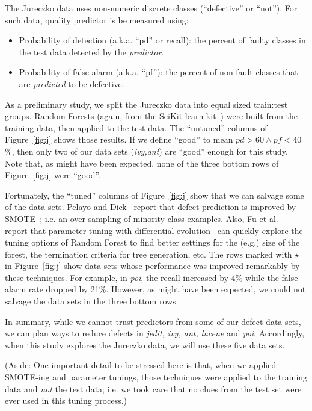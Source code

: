 \documentclass{sig-alternate}
\newcommand{\bi}{\begin{itemize}}
\newcommand{\ei}{\end{itemize}}
\newcommand{\fig}[1]{Figure~\ref{fig:#1}}
\begin{document}
The  Jureczko data uses non-numeric discrete classes (``defective'' or ``not'').
For such data, quality predictor   is be measured using:
\bi
\item Probability of detection (a.k.a. ``pd'' or recall):  the percent of faulty classes in
the test data detected
by the {\em predictor}.
\item Probability of false alarm (a.k.a. ``pf''): the percent of non-fault
classes that are {\em predicted} to be defective.
\ei 
As a preliminary study, we split the Jureczko  data   into equal sized train:test groups.
Random Forests (again, from the SciKit learn kit~\cite{Pedregosa2012}) were
built from the training data, then applied to the test data.
The ``untuned'' columns of \fig{j} shows those results.
If we define ``good'' to mean $\mathit{pd}>60 \wedge \mathit{pf} < 40$\%,
then only two of our data sets ({\em ivy,ant}) are ``good'' enough for this study.
Note that, as might have been expected, none of the three bottom rows of \fig{j} were ``good''.

Fortunately,
the ``tuned'' columns of \fig{j} show that we can salvage some of the data sets. Pelayo and Dick~\cite{pelayo07} report that defect prediction is improved by SMOTE~\cite{Chawla2002}; i.e. an over-sampling of minority-class examples. Also, Fu et al.~\cite{fu:fse16} report that parameter tuning with differential evolution~\cite{storn97} can quickly explore the tuning options of Random Forest to find better settings for the (e.g.) size of the forest, the termination criteria
for tree generation, etc. The rows marked with $\star$ in \fig{j} show data sets whose performance was improved remarkably by these techniques. For example, in {\em poi}, the recall increased by 4\% while the false alarm rate dropped by 21\%. However,  as might have been expected, we could not salvage the data sets in the  three bottom rows.

In summary, while we cannot trust predictors from some of our defect data sets,
we can plan ways to reduce defects in {\em jedit, ivy, ant, lucene} and {\em poi}.
Accordingly, when this study explores the Jureczko data, we will use these five data sets.

(Aside: One important detail to be stressed here is that, when we applied    SMOTE-ing and
parameter tunings, those techniques were applied to the training data and {\em not}
the test data; i.e. we took care that no clues from the test set were ever used in this tuning process.)
\end{document}
